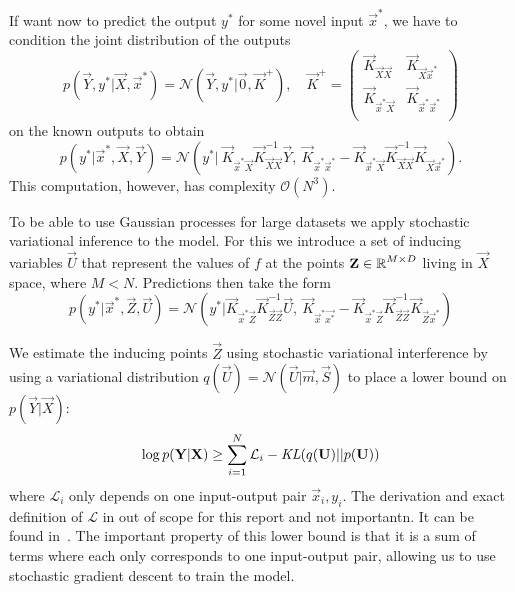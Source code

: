 If want now to predict the output $y^*$ for some novel input $\vec{x}^*$, we have to
condition the joint distribution of the outputs
\begin{equation}
    p(\vec{Y}, y^*|\vec{X}, \vec{x}^*) = \mathcal{N}(\vec{Y}, y^*|\vec{0},
    \vec{K}^+), \quad \vec{K}^+ =
    \begin{pmatrix}
        \vec{K}_{\vec{X}\vec{X}} & \vec{K}_{\vec{X}\vec{x}^*} \\
        \vec{K}_{\vec{x}^*\vec{X}} & \vec{K}_{\vec{x}^*\vec{x}^*} \\
    \end{pmatrix}
\end{equation}
on the known outputs to obtain~\cite{barberBRML2012}
\begin{equation}
    p(y^* | \vec{x}^*, \vec{X}, \vec{Y}) = \mathcal{N}(y^* |\ \vec{K}_{\vec{x}^*\vec{X}}
    \vec{K}_{\vec{X}\vec{X}}^{-1}\vec{Y},\ \vec{K}_{\vec{x}^*\vec{x}^*} -
    \vec{K}_{\vec{x}^*\vec{X}} \vec{K}_{\vec{X}\vec{X}}^{-1} \vec{K}_{\vec{X}\vec{x}^*}).
\end{equation}
This computation, however, has complexity $\mathcal{O}(N^3)$.

To be able to use Gaussian processes for large datasets we apply stochastic
variational inference to the model. For this we introduce a set of inducing
variables $\vec{U}$ that represent the values of $f$ at the points $\mathbf{Z} \in
\operatorname{\mathbb{R}}^{M \times D}$ living in $\vec{X}$ space, where $M<N$. Predictions then take
the form
\begin{equation}
    p(y^* | \vec{x}^*, \vec{Z}, \vec{U}) = \mathcal{N}( y^* |
    \vec{K}_{\vec{x}^*\vec{Z}} \vec{K}_{\vec{Z}\vec{Z}}^{-1}\vec{U},\
    \vec{K}_{\vec{x}^*\vec{x^*}} - \vec{K}_{\vec{x}^*\vec{Z}}
    \vec{K}_{\vec{Z}\vec{Z}}^{-1}\vec{K}_{\vec{Z}\vec{x}^*})
\end{equation}

We estimate the inducing points $\vec{Z}$ using stochastic variational
interference by using a variational distribution $q(\vec{U}) = \mathcal{N}
(\vec{U} | \vec{m}, \vec{S})$ to
place a lower bound on $p(\vec{Y} | \vec{X})$:
\begin{equation}
    \log p(\mathbf{Y} | \mathbf{X}) \geq \sum_{i=1}^{N} \mathcal{L}_i -
    \operatorname{\textit{KL}}(q(\mathbf{U}) || p(\mathbf{U}))
\end{equation}
where $\mathcal{L}_i$ only depends on one input-output pair ${\vec{x}_i, y_i}$.
The derivation and exact definition of $\mathcal{L}$ in out of scope for this
report and not importantn. It can be found in~\cite{hensman2013gaussian}. The
important property of this lower bound is that it is a sum of terms where each
only corresponds to one input-output pair, allowing us to use stochastic
gradient descent to train the model.

